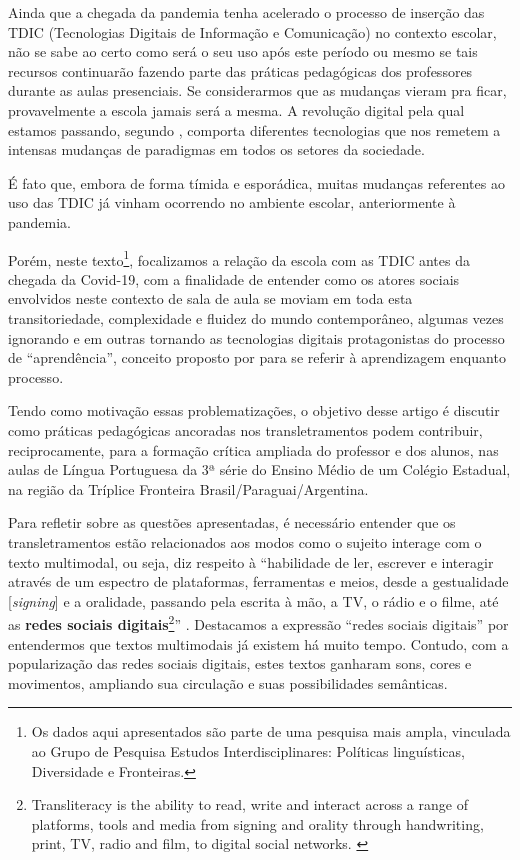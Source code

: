 \documentclass{textolivre}
\begin{document}
Ainda que a chegada da pandemia tenha acelerado o processo de inserção das TDIC (Tecnologias Digitais de Informação e Comunicação) no contexto escolar, não se sabe ao certo como será o seu uso após este período ou mesmo se tais recursos continuarão fazendo parte das práticas pedagógicas dos professores durante as aulas presenciais. Se considerarmos que as mudanças vieram pra ficar, provavelmente a escola jamais será a mesma. A revolução digital pela qual estamos passando, segundo \textcite{affonso2017}, comporta diferentes tecnologias que nos remetem a intensas mudanças de paradigmas em todos os setores da sociedade.

É fato que, embora de forma tímida e esporádica, muitas mudanças referentes ao uso das TDIC já vinham ocorrendo no ambiente escolar, anteriormente à pandemia. 

Porém, neste texto\footnote{Os dados aqui apresentados são parte de uma pesquisa mais ampla, vinculada ao Grupo de Pesquisa Estudos Interdisciplinares: Políticas linguísticas, Diversidade e Fronteiras.}, focalizamos a relação da escola com as TDIC antes da chegada da Covid-19, com a finalidade de entender como os atores sociais envolvidos neste contexto de sala de aula se moviam em toda esta transitoriedade, complexidade e fluidez do mundo contemporâneo, algumas vezes ignorando e em outras tornando as tecnologias digitais protagonistas do processo de “aprendência”, conceito proposto por \textcite{assmann2001} para se referir à aprendizagem enquanto processo.


Tendo como motivação essas problematizações, o objetivo desse artigo é discutir como práticas pedagógicas ancoradas nos transletramentos podem contribuir, reciprocamente, para a formação crítica ampliada do professor e dos alunos, nas aulas de Língua Portuguesa da 3ª série do Ensino Médio de um Colégio Estadual, na região da Tríplice Fronteira Brasil/Paraguai/Argentina.

Para refletir sobre as questões apresentadas, é necessário entender que os transletramentos estão relacionados aos modos como o sujeito interage com o texto multimodal, ou seja, diz respeito à “habilidade de ler, escrever e interagir através de um espectro de plataformas, ferramentas e meios, desde a gestualidade [\emph{signing}] e a oralidade, passando pela escrita à mão, a TV, o rádio e o filme, até as \textbf{redes sociais digitais}\footnote{Transliteracy is the ability to read, write and interact across a range of platforms, tools and media from signing and orality through handwriting, print, TV, radio and film, to digital social networks. \cite{thomas2007}
}” \cite[p.~2 - grifos nossos]{thomas2007}. Destacamos a expressão “redes sociais digitais” por entendermos que textos multimodais já existem há muito tempo. Contudo, com a popularização das redes sociais digitais, estes textos ganharam sons, cores e movimentos, ampliando sua circulação e suas possibilidades semânticas.
\end{document}
